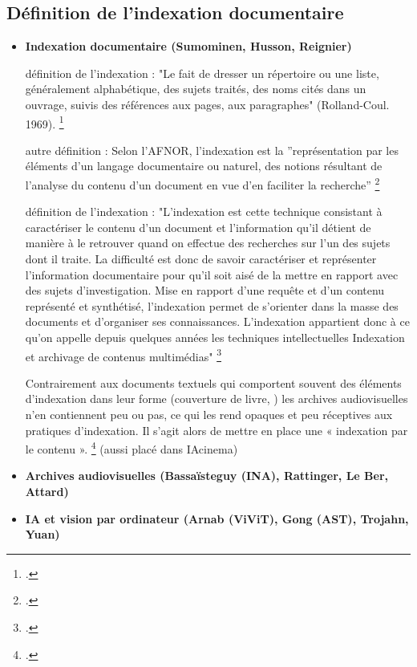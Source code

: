 	\subsection*{Définition de l'indexation documentaire}
	
	\begin{itemize}
		\item \textbf{Indexation documentaire (Sumominen, Husson, Reignier)}
		
	définition de l'indexation : 
	"Le fait de dresser un répertoire ou une liste, généralement alphabétique, des sujets traités, des noms cités dans un ouvrage, suivis des références aux pages, aux paragraphes" (Rolland-Coul. 1969).
		\footcite{zotero-item-572}
		
	autre définition : 
	 Selon l'AFNOR, l'indexation est la ”représentation par les éléments d’un langage documentaire ou naturel, des
	notions résultant de l’analyse du contenu d’un document en vue d’en faciliter la recherche”
	\footcite{husson2025}
	
	définition de l'indexation :
	"L'indexation est cette technique consistant à caractériser le contenu d'un document et l'information qu'il détient de manière à le retrouver quand on effectue des recherches sur l'un des sujets dont il traite. La difficulté est donc de savoir caractériser et représenter l'information documentaire pour qu'il soit aisé de la mettre en rapport avec des sujets d'investigation. Mise en rapport d'une requête et d'un contenu représenté et synthétisé, l'indexation permet de s'orienter dans la masse des documents et d'organiser ses connaissances. L'indexation appartient donc à ce qu'on appelle depuis quelques années les techniques intellectuelles Indexation et archivage de contenus multimédias"
	\footcite{zotero-item-582}
	
	
	Contrairement aux documents textuels qui comportent souvent des éléments d'indexation dans leur forme (couverture de livre, ) les archives audiovisuelles n'en contiennent peu ou pas, ce qui les rend opaques et peu réceptives aux pratiques d'indexation. Il s'agit alors de mettre en place une « indexation par le contenu ». \footcite{zotero-item-582} (aussi placé dans IAcinema)

	
	
	
	\item \textbf{Archives audiovisuelles (Bassaïsteguy (INA), Rattinger, Le Ber, Attard)}
	
	\item \textbf{IA et vision par ordinateur (Arnab (ViViT), Gong (AST), Trojahn, Yuan)}
	
	
	
	
	
	\end{itemize}


	


